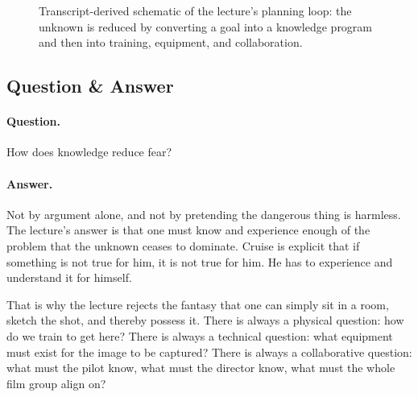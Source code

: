 \begin{figure}[h]
\centering
{}
\caption{Transcript-derived schematic of the lecture's planning loop: the unknown is reduced by converting a goal into a knowledge program and then into training, equipment, and collaboration.}
\end{figure}

\subsection{Question \& Answer}

\paragraph{Question.} How does knowledge reduce fear?

\paragraph{Answer.} Not by argument alone, and not by pretending the dangerous thing is harmless. The lecture's answer is that one must know and experience enough of the problem that the unknown ceases to dominate. Cruise is explicit that if something is not true for him, it is not true for him. He has to experience and understand it for himself.

That is why the lecture rejects the fantasy that one can simply sit in a room, sketch the shot, and thereby possess it. There is always a physical question: how do we train to get here? There is always a technical question: what equipment must exist for the image to be captured? There is always a collaborative question: what must the pilot know, what must the director know, what must the whole film group align on?

